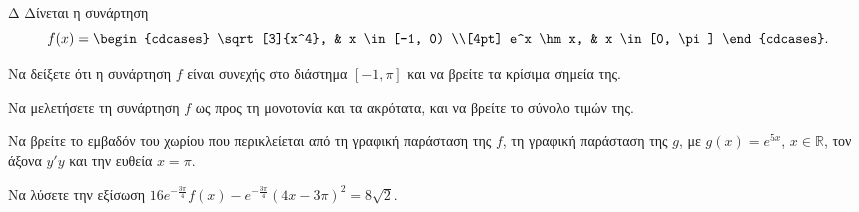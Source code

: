 \begin{thema}{Δ}
Δίνεται η συνάρτηση
\[
f(x) = \begin{cdcases} \sqrt[3]{x^4}, & x \in [-1, 0) \\[4pt] e^x \hm x, & x \in [0, \pi] \end{cdcases}.
\]
\begin{erwthma}
    \item Να δείξετε ότι η συνάρτηση $f$ είναι συνεχής στο διάστημα $[-1, \pi]$ και να βρείτε τα κρίσιμα σημεία της. 
    \item Να μελετήσετε τη συνάρτηση $f$ ως προς τη μονοτονία και τα ακρότατα, και να βρείτε το σύνολο τιμών της. 
    \item Να βρείτε το εμβαδόν του χωρίου που περικλείεται από τη γραφική παράσταση της $f$, τη γραφική παράσταση της $g$, με $g(x) = e^{5x}$, $x \in \mathbb{R}$, τον άξονα $y'y$ και την ευθεία $x = \pi$. 
    \item Να λύσετε την εξίσωση $16e^{-\frac{3\pi}{4}} f(x) - e^{-\frac{3\pi}{4}}(4x - 3\pi)^2 = 8\sqrt{2}$. 
\end{erwthma}
\end{thema}

